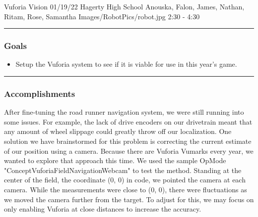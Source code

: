 \insertmeeting 
	{Vuforia Vision} 
	{01/19/22} 
	{Hagerty High School}
	{Anouska, Falon, James, Nathan, Ritam, Rose, Samantha}
	{Images/RobotPics/robot.jpg}
	{2:30 - 4:30}
	
\noindent\hfil\rule{\textwidth}{.4pt}\hfil
\subsubsection*{Goals}
\begin{itemize}
    \item Setup the Vuforia system to see if it is viable for use in this year's game.  

\end{itemize} 

\noindent\hfil\rule{\textwidth}{.4pt}\hfil

\subsubsection*{Accomplishments}
After fine-tuning the road runner navigation system, we were still running into some issues. For example, the lack of drive encoders on our drivetrain meant that any amount of wheel slippage could greatly throw off our localization. One solution we have brainstormed for this problem is correcting the current estimate of our position using a camera. Because there are Vuforia Vumarks every year, we wanted to explore that approach this time. We used the sample OpMode "ConceptVuforiaFieldNavigationWebcam" to test the method. Standing at the center of the field, the coordinate (0, 0) in code, we pointed the camera at each camera. While the measurements were close to (0, 0), there were fluctuations as we moved the camera further from the target. To adjust for this, we may focus on only enabling Vuforia at close distances to increase the accuracy.


